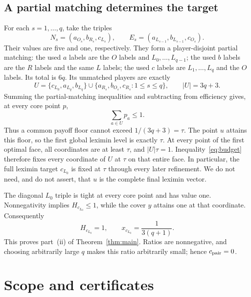 \documentclass[11pt]{article}
\theoremstyle{remark}\newtheorem{remark}[theorem]{Remark}
\begin{document}
\subsection{A partial matching determines the target}
For each $s=1,\ldots,q$, take the triples
\[
 N_s=(a_{O_s},b_{R_s},c_{L_s}),\qquad
 E_s=(a_{L_{s-1}},b_{L_{s-1}},c_{O_s}).
\]
Their values are five and one, respectively. They form a player-disjoint
partial matching: the used $a$ labels are the $O$ labels and
$L_0,\ldots,L_{q-1}$; the used $b$ labels are the $R$ labels and the same
$L$ labels; the used $c$ labels are $L_1,\ldots,L_q$ and the $O$ labels.
Its total is $6q$. Its unmatched players are exactly
\begin{equation}\label{eq:unmatched}
 U=\{c_{L_0},a_{L_q},b_{L_q}\}
       \cup\{a_{R_s},b_{O_s},c_{R_s}:1\leq s\leq q\},
       \qquad |U|=3q+3.
\end{equation}
Summing the partial-matching inequalities and subtracting from efficiency
gives, at every core point $p$,
\begin{equation}\label{eq:budget}
                       \sum_{a\in U}p_a\leq1.
\end{equation}
Thus a common payoff floor cannot exceed $1/(3q+3)=\tau$. The point
$u$ attains this floor, so the first global leximin level is exactly
$\tau$. At every point of the first optimal face, all coordinates are
at least $\tau$, and $|U|\tau=1$. Inequality~\eqref{eq:budget} therefore
fixes every coordinate of $U$ at $\tau$ on that entire face. In particular,
the full leximin target $c_{L_0}$ is fixed at $\tau$ through every later
refinement. We do not need, and do not assert, that $u$ is the complete
final leximin vector.

The diagonal $L_0$ triple is tight at every core point and has value one.
Nonnegativity implies $H_{c_{L_0}}\leq1$, while the cover $y$ attains
one at that coordinate. Consequently
\[
       H_{c_{L_0}}=1,\qquad x_{c_{L_0}}=\frac{1}{3(q+1)}.
\]
This proves part~(ii) of Theorem~\ref{thm:main}. Ratios are nonnegative,
and choosing arbitrarily large $q$ makes this ratio arbitrarily small;
hence $c_{\rm pair}=0$.

\section{Scope and certificates}
\end{document}

